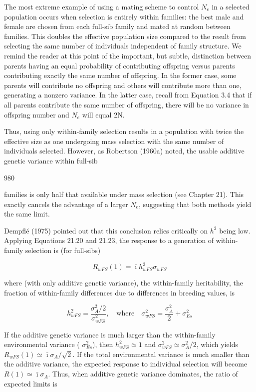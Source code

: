 \documentclass{article}
\begin{document}
{The most extreme example of using a mating scheme to control  $ N_e $ in a selected population occurs when selection is entirely within families: the best male and female are chosen from each full-sib family and mated at random between families. This doubles the effective population size compared to the result from selecting the same number of individuals independent of family structure. We remind the reader at this point of the important, but subtle, distinction between parents having an equal probability of contributing offspring versus parents contributing exactly the same number of offspring. In the former case, some parents will contribute no offspring and others will contribute more than one, generating a nonzero variance. In the latter case, recall from Equation 3.4 that if all parents contribute the same number of offspring, there will be no variance in offspring number and  $ N_e $ will equal 2N.

Thus, using only within-family selection results in a population with twice the effective size as one undergoing mass selection with the same number of individuals selected. However, as Robertson (1960a) noted, the usable additive genetic variance within full-sib

980

families is only half that available under mass selection (see Chapter 21). This exactly cancels the advantage of a larger  $ N_{e} $, suggesting that both methods yield the same limit.

Dempflé (1975) pointed out that this conclusion relies critically on  $ h^{2} $ being low. Applying Equations 21.20 and 21.23, the response to a generation of within-family selection is (for full-sibs)

\begin{equation}
R_{w F S}(1)=\bar{\imath}h_{w F S}^{2}\sigma_{w F S}
\end{equation}

where (with only additive genetic variance), the within-family heritability, the fraction of within-family differences due to differences in breeding values, is

\begin{equation}
h_{w F S}^{2}=\frac{\sigma_{A}^{2}/2}{\sigma_{w F S}^{2}},\quad\mathrm{w h e r e}\quad\sigma_{w F S}^{2}=\frac{\sigma_{A}^{2}}{2}+\sigma_{E s}^{2}
\end{equation}

If the additive genetic variance is much larger than the within-family environmental variance ( $ \sigma_{Es}^2 $), then  $ h_{wFS}^2 \simeq 1 $ and  $ \sigma_{wFS}^2 \simeq \sigma_A^2 / 2 $, which yields  $ R_{wFS}(1) \simeq \bar{\imath} \sigma_A / \sqrt{2} $. If the total environmental variance is much smaller than the additive variance, the expected response to individual selection will become  $ R(1) \simeq \bar{\imath} \sigma_A $. Thus, when additive genetic variance dominates, the ratio of expected limits is

}
\end{document}
